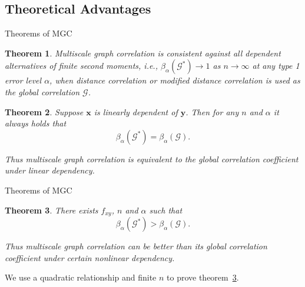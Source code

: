 \documentclass{beamer}
\newtheorem{thm}{Theorem}
\newcommand{\G}{\mathcal{G}}
\providecommand{\mb}[1]{\boldsymbol{#1}}
\begin{document}
\subsection{Theoretical Advantages}
\begin{frame}{Theorems of MGC}
\begin{thm}
\label{thm1}
Multiscale graph correlation is consistent against all dependent alternatives of finite second moments, i.e., $\beta_{\alpha}(\G^{*}) \rightarrow 1$ as $n\rightarrow \infty$ at any type 1 error level $\alpha$, when distance correlation or modified distance correlation is used as the global correlation $\G$.
\end{thm}
\pause
\medskip
\begin{thm}
\label{thm2}
Suppose $\mb{x}$ is linearly dependent of $\mb{y}$. Then for any $n$ and $\alpha$ it always holds that
\begin{equation}
\beta_{\alpha}(\G^{*}) = \beta_{\alpha}(\G).
\end{equation}

Thus multiscale graph correlation is equivalent to the global correlation coefficient under linear dependency.
\end{thm}

\end{frame}

\begin{frame}{Theorems of MGC}
\begin{thm}
\label{thm3}
There exists $f_{xy}$, $n$ and $\alpha$ such that 
\begin{equation}
\beta_{\alpha}(\G^{*}) > \beta_{\alpha}(\G).
\end{equation}

Thus multiscale graph correlation can be better than its global correlation coefficient under certain nonlinear dependency.
\end{thm}
We use a quadratic relationship and finite $n$ to prove theorem~\ref{thm3}.
\end{frame}
\end{document}
